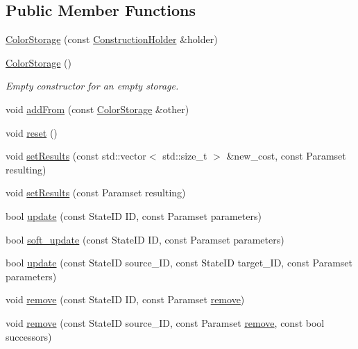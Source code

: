\subsection*{\-Public \-Member \-Functions}
\begin{DoxyCompactItemize}
\item 
\hyperlink{classColorStorage_adf7976d864b12f389b98bd6fa103e05d}{\-Color\-Storage} (const \hyperlink{classConstructionHolder}{\-Construction\-Holder} \&holder)
\item 
\hypertarget{classColorStorage_a767d39265e155a8248c542077cfd659b}{\hyperlink{classColorStorage_a767d39265e155a8248c542077cfd659b}{\-Color\-Storage} ()}\label{classColorStorage_a767d39265e155a8248c542077cfd659b}

\begin{DoxyCompactList}\small\item\em \-Empty constructor for an empty storage. \end{DoxyCompactList}\item 
void \hyperlink{classColorStorage_aff6195f205660f815b170679f90b23f3}{add\-From} (const \hyperlink{classColorStorage}{\-Color\-Storage} \&other)
\item 
void \hyperlink{classColorStorage_a28df40cbd88c30ab37be0eb8ac868007}{reset} ()
\item 
void \hyperlink{classColorStorage_abae0ceed27174b8f9e4587630b9892cf}{set\-Results} (const std\-::vector$<$ std\-::size\-\_\-t $>$ \&new\-\_\-cost, const \-Paramset resulting)
\item 
void \hyperlink{classColorStorage_adb546fbf8f96051ab9b5e3a5cad18245}{set\-Results} (const \-Paramset resulting)
\item 
bool \hyperlink{classColorStorage_af46acc0ee8c25915ea683b64b5a9559d}{update} (const \-State\-I\-D \-I\-D, const \-Paramset parameters)
\item 
bool \hyperlink{classColorStorage_a34a7ebb10ac5e2f20039082bb55bb650}{soft\-\_\-update} (const \-State\-I\-D \-I\-D, const \-Paramset parameters)
\item 
bool \hyperlink{classColorStorage_a3a70ab5e653b3c34909b5ea7a16888eb}{update} (const \-State\-I\-D source\-\_\-\-I\-D, const \-State\-I\-D target\-\_\-\-I\-D, const \-Paramset parameters)
\item 
void \hyperlink{classColorStorage_aabf4f8151046e9ec96996f09733ac62e}{remove} (const \-State\-I\-D \-I\-D, const \-Paramset \hyperlink{classColorStorage_aabf4f8151046e9ec96996f09733ac62e}{remove})
\item 
void \hyperlink{classColorStorage_a174710660000f1fdf51c0f15bc5d29b9}{remove} (const \-State\-I\-D source\-\_\-\-I\-D, const \-Paramset \hyperlink{classColorStorage_aabf4f8151046e9ec96996f09733ac62e}{remove}, const bool successors)

\end{DoxyCompactItemize}

